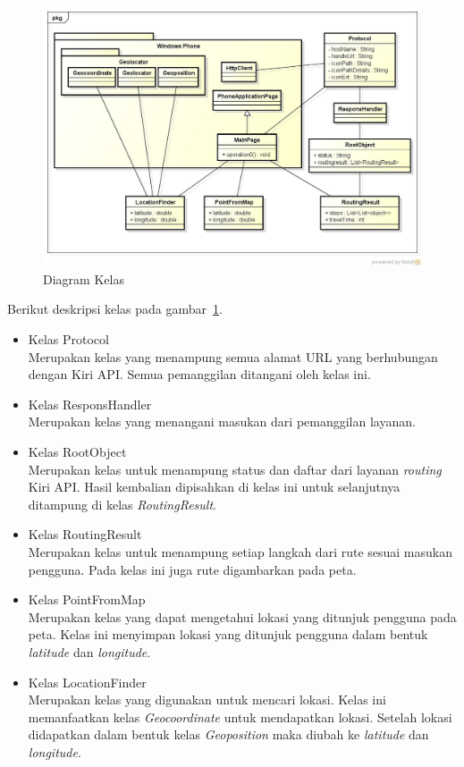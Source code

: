 \begin{figure}[h]
	\centering
		\includegraphics[scale=0.4]{Gambar/useCase_dan_Class/class}
	\caption{Diagram Kelas}
	\label{fig:kelas}
\end{figure}

Berikut deskripsi kelas pada gambar~\ref{fig:kelas}.
\begin{itemize}
	\item Kelas Protocol \\
	Merupakan kelas yang menampung semua alamat URL yang berhubungan dengan Kiri API. Semua pemanggilan ditangani oleh kelas ini.
	\item Kelas ResponsHandler \\
	Merupakan kelas yang menangani masukan dari pemanggilan layanan.
	\item Kelas RootObject \\
	Merupakan kelas untuk menampung status dan daftar dari layanan \textit{routing} Kiri API. Hasil kembalian dipisahkan di kelas ini untuk selanjutnya ditampung di kelas \textit{RoutingResult}. 
	\item Kelas RoutingResult \\
	Merupakan kelas untuk menampung setiap langkah dari rute sesuai masukan pengguna. Pada kelas ini juga rute digambarkan pada peta.
	\item Kelas PointFromMap \\
	Merupakan kelas yang dapat mengetahui lokasi yang ditunjuk pengguna pada peta. Kelas ini menyimpan lokasi yang ditunjuk pengguna dalam bentuk \textit{latitude} dan \textit{longitude}.
	\item Kelas LocationFinder \\
	Merupakan kelas yang digunakan untuk mencari lokasi. Kelas ini memanfaatkan kelas \textit{Geocoordinate} untuk mendapatkan lokasi. Setelah lokasi didapatkan dalam bentuk kelas \textit{Geoposition} maka diubah ke \textit{latitude} dan \textit{longitude}. 
\end{itemize}